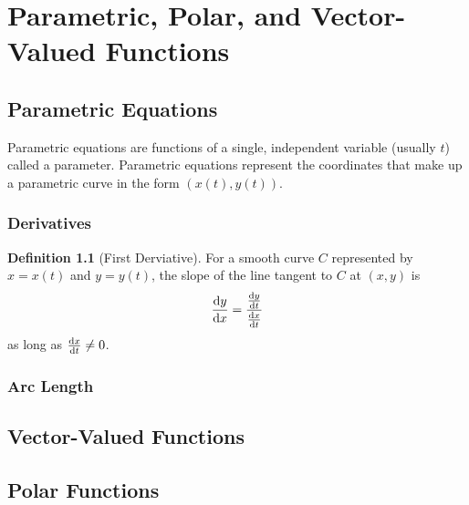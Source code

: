 \documentclass[letterpaper]{report}
\theoremstyle{definition}
\newtheorem{definition}{Definition}
\begin{document}
\chapter{Parametric, Polar, and Vector-Valued Functions}
\section{Parametric Equations}
Parametric equations are functions of a single, independent variable 
(usually $t$) called a parameter.
Parametric equations represent the coordinates that make up a parametric curve
in the form $(x(t), y(t))$.
\subsection{Derivatives}
\begin{definition}[First Derviative]
    For a smooth curve $C$ represented by $x = x(t)$ and $y = y(t)$,
    the slope of the line tangent to $C$ at $(x,y)$ is
\[ \dv{y}{x} = \frac{\dv{y}{t}}{\dv{x}{t}} \]
as long as $\dv{x}{t} \neq 0$. 
\end{definition}
\subsection{Arc Length}
\section{Vector-Valued Functions}
\section{Polar Functions}
\end{document}

